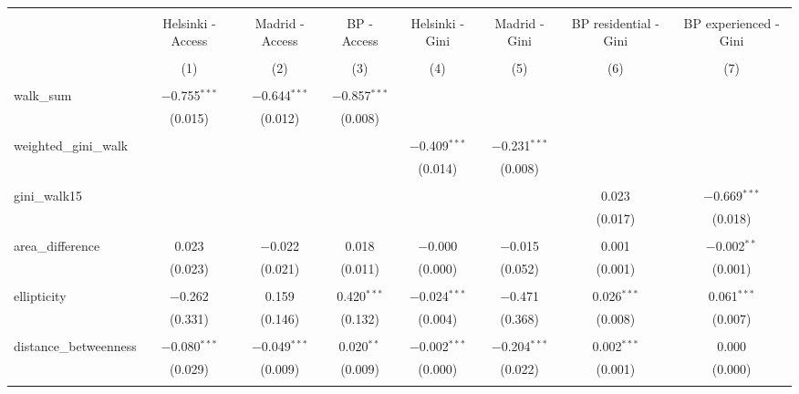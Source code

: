 
\begin{table}[!htbp] \centering 
  \caption{} 
  \label{} 
\begin{tabular}{@{\extracolsep{5pt}}lccccccc} 
\\[-1.8ex]\hline 
\hline \\[-1.8ex] 
 & Helsinki - Access & Madrid - Access & BP - Access & Helsinki - Gini & Madrid - Gini & BP residential - Gini & BP experienced - Gini \\ 
\\[-1.8ex] & (1) & (2) & (3) & (4) & (5) & (6) & (7)\\ 
\hline \\[-1.8ex] 
 walk\_sum & $-$0.755$^{***}$ & $-$0.644$^{***}$ & $-$0.857$^{***}$ &  &  &  &  \\ 
  & (0.015) & (0.012) & (0.008) &  &  &  &  \\ 
  & & & & & & & \\ 
 weighted\_gini\_walk &  &  &  & $-$0.409$^{***}$ & $-$0.231$^{***}$ &  &  \\ 
  &  &  &  & (0.014) & (0.008) &  &  \\ 
  & & & & & & & \\ 
 gini\_walk15 &  &  &  &  &  & 0.023 & $-$0.669$^{***}$ \\ 
  &  &  &  &  &  & (0.017) & (0.018) \\ 
  & & & & & & & \\ 
 area\_difference & 0.023 & $-$0.022 & 0.018 & $-$0.000 & $-$0.015 & 0.001 & $-$0.002$^{**}$ \\ 
  & (0.023) & (0.021) & (0.011) & (0.000) & (0.052) & (0.001) & (0.001) \\ 
  & & & & & & & \\ 
 ellipticity & $-$0.262 & 0.159 & 0.420$^{***}$ & $-$0.024$^{***}$ & $-$0.471 & 0.026$^{***}$ & 0.061$^{***}$ \\ 
  & (0.331) & (0.146) & (0.132) & (0.004) & (0.368) & (0.008) & (0.007) \\ 
  & & & & & & & \\ 
 distance\_betweenness & $-$0.080$^{***}$ & $-$0.049$^{***}$ & 0.020$^{**}$ & $-$0.002$^{***}$ & $-$0.204$^{***}$ & 0.002$^{***}$ & 0.000 \\ 
  & (0.029) & (0.009) & (0.009) & (0.000) & (0.022) & (0.001) & (0.000) \\ 
  & & & & & & & \\ 

\end{tabular}
\end{table}
